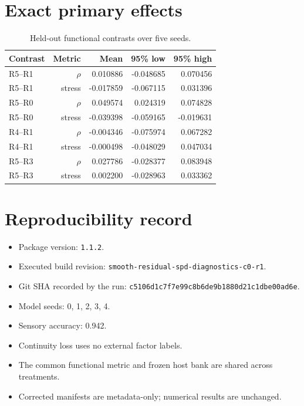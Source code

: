 \documentclass[11pt,a4paper]{article}
\begin{document}
\section{Exact primary effects}
\begin{table}[H]
\centering
\caption{Held-out functional contrasts over five seeds.}
\small
\begin{tabular}{lrrrr}
\toprule
Contrast & Metric & Mean & 95\% low & 95\% high \\
\midrule
R5--R1 & $\rho$ & 0.010886 & -0.048685 & 0.070456 \\
R5--R1 & stress & -0.017859 & -0.067115 & 0.031396 \\
R5--R0 & $\rho$ & 0.049574 & 0.024319 & 0.074828 \\
R5--R0 & stress & -0.039398 & -0.059165 & -0.019631 \\
R4--R1 & $\rho$ & -0.004346 & -0.075974 & 0.067282 \\
R4--R1 & stress & -0.000498 & -0.048029 & 0.047034 \\
R5--R3 & $\rho$ & 0.027786 & -0.028377 & 0.083948 \\
R5--R3 & stress & 0.002200 & -0.028963 & 0.033362 \\
\bottomrule
\end{tabular}
\end{table}

\section{Reproducibility record}
\begin{itemize}
\item Package version: \texttt{1.1.2}.
\item Executed build revision: \texttt{smooth-residual-spd-diagnostics-c0-r1}.
\item Git SHA recorded by the run: \texttt{c5106d1c7f7e99c8b6de9b1880d21c1dbe00ad6e}.
\item Model seeds: 0, 1, 2, 3, 4.
\item Sensory accuracy: 0.942.
\item Continuity loss uses no external factor labels.
\item The common functional metric and frozen host bank are shared across treatments.
\item Corrected manifests are metadata-only; numerical results are unchanged.
\end{itemize}
\end{document}
